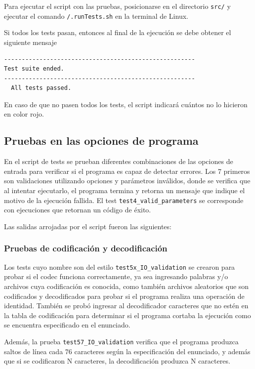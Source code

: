 Para ejecutar el script con las pruebas, posicionarse en el directorio \texttt{src/} y ejecutar el comando \texttt{/.runTests.sh} en la terminal de Linux.

Si todos los tests pasan, entonces al final de la ejecución se debe obtener el siguiente mensaje
\begin{lstlisting}[language=bash, style=StyleC]
------------------------------------------------------
Test suite ended.
------------------------------------------------------
  All tests passed.
\end{lstlisting}
En caso de que no pasen todos los tests, el script indicará cuántos no lo hicieron en color rojo.

\subsection{Pruebas en las opciones de programa}

En el script de tests se prueban diferentes combinaciones de las opciones de entrada para verificar si el programa es capaz de detectar errores. Los 7 primeros son validaciones utilizando opciones y parámetros inválidos, donde se verifica que al intentar ejecutarlo, el programa termina y retorna un mensaje que indique el motivo de la ejecución fallida. El test \texttt{test4\_valid\_parameters} se corresponde con ejecuciones que retornan un código de éxito. 

Las salidas arrojadas por el script fueron las siguientes:



\subsubsection{Pruebas de codificación y decodificación}

Los tests cuyo nombre son del estilo \texttt{test5x\_IO\_validation} se crearon para probar si el codec funciona correctamente, ya sea ingresando palabras y/o archivos cuya codificación es conocida, como también archivos aleatorios que son codificados y decodificados para probar si el programa realiza una operación de identidad. También se probó ingresar al decodificador caracteres que no estén en la tabla de codificación para determinar si el programa cortaba la ejecución como se encuentra especificado en el enunciado.

Además, la prueba \texttt{test57\_IO\_validation} verifica que el programa produzca saltos de línea cada 76 caracteres según la especificación del enunciado, y además que si se codificaron N caracteres, la decodificación produzca N caracteres.

